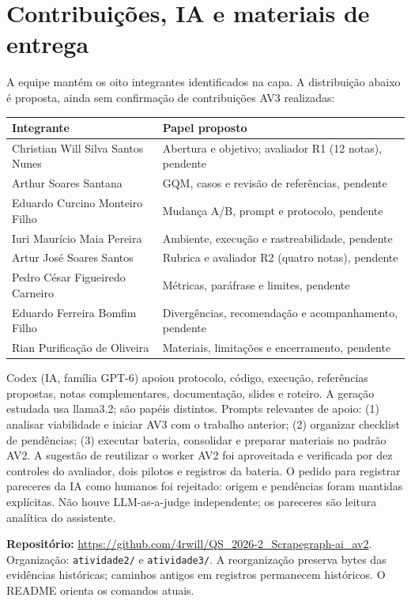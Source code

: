 \documentclass[a4paper,12pt]{article}
\newcommand{\arquivo}[1]{\nolinkurl{#1}}
\begin{document}
\section{Contribuições, IA e materiais de entrega}
A equipe mantém os oito integrantes identificados na capa. A distribuição abaixo é proposta, ainda sem confirmação de contribuições AV3 realizadas:
\begingroup\small\begin{longtable}{@{}p{4.7cm}p{9.7cm}@{}}\toprule
Integrante & Papel proposto \\\midrule
Christian Will Silva Santos Nunes & Abertura e objetivo; avaliador R1 (12 notas), pendente \\
Arthur Soares Santana & GQM, casos e revisão de referências, pendente \\
Eduardo Curcino Monteiro Filho & Mudança A/B, prompt e protocolo, pendente \\
Iuri Maurício Maia Pereira & Ambiente, execução e rastreabilidade, pendente \\
Artur José Soares Santos & Rubrica e avaliador R2 (quatro notas), pendente \\
Pedro César Figueiredo Carneiro & Métricas, paráfrase e limites, pendente \\
Eduardo Ferreira Bomfim Filho & Divergências, recomendação e acompanhamento, pendente \\
Rian Purificação de Oliveira & Materiais, limitações e encerramento, pendente \\\bottomrule
\end{longtable}\endgroup

Codex (IA, família GPT-6) apoiou protocolo, código, execução, referências propostas, notas complementares, documentação, slides e roteiro. A geração estudada usa llama3.2; são papéis distintos. Prompts relevantes de apoio: (1) analisar viabilidade e iniciar AV3 com o trabalho anterior; (2) organizar checklist de pendências; (3) executar bateria, consolidar e preparar materiais no padrão AV2. A sugestão de reutilizar o worker AV2 foi aproveitada e verificada por dez controles do avaliador, dois pilotos e registros da bateria. O pedido para registrar pareceres da IA como humanos foi rejeitado: origem e pendências foram mantidas explícitas. Não houve LLM-as-a-judge independente; os pareceres são leitura analítica do assistente.

\textbf{Repositório:} \url{https://github.com/4rwill/QS_2026-2_Scrapegraph-ai_av2}. Organização: \arquivo{atividade2/} e \arquivo{atividade3/}. A reorganização preserva bytes das evidências históricas; caminhos antigos em registros permanecem históricos. O README orienta os comandos atuais.
\end{document}

